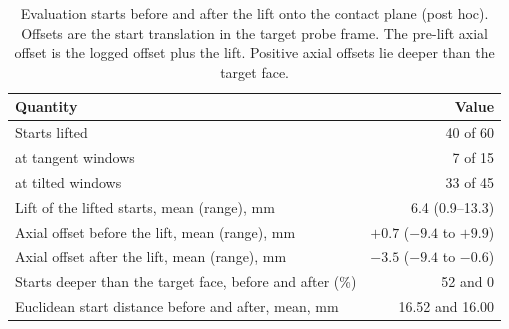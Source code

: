 
\begin{table}[tbp]
\renewcommand{\baselinestretch}{1}\small
\caption{Evaluation starts before and after the lift onto the contact plane (post hoc). Offsets are the start translation in the target probe frame. The pre-lift axial offset is the logged offset plus the lift. Positive axial offsets lie deeper than the target face.}
\label{tab:posthoc-starts}
\centering
\begin{tabular}{@{}l r@{}}
\toprule
Quantity & Value \\
\midrule
Starts lifted & 40 of 60 \\
\quad at tangent windows & 7 of 15 \\
\quad at tilted windows & 33 of 45 \\
Lift of the lifted starts, mean (range), mm & 6.4 (0.9--13.3) \\
Axial offset before the lift, mean (range), mm & $+0.7$ ($-9.4$ to $+9.9$) \\
Axial offset after the lift, mean (range), mm & $-3.5$ ($-9.4$ to $-0.6$) \\
Starts deeper than the target face, before and after (\%) & 52 and 0 \\
Euclidean start distance before and after, mean, mm & 16.52 and 16.00 \\
\bottomrule
\end{tabular}
\end{table}
